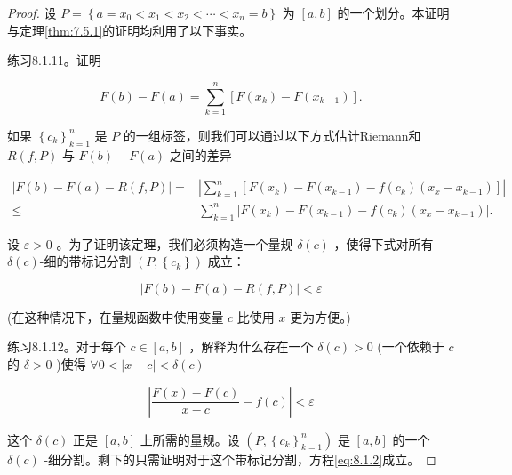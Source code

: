 \begin{proof}
设 \(P = \left\{  {a = {x}_{0} < {x}_{1} < {x}_{2} < \cdots  < {x}_{n} = b}\right\}\) 为 \(\left\lbrack  {a,b}\right\rbrack\) 的一个划分。本证明与定理\ref{thm:7.5.1}的证明均利用了以下事实。

练习8.1.11。证明

\[
F\left( b\right)  - F\left( a\right)  = \mathop{\sum }\limits_{{k = 1}}^{n}\left\lbrack  {F\left( {x}_{k}\right)  - F\left( {x}_{k - 1}\right) }\right\rbrack  .
\]

如果 \({\left\{  {c}_{k}\right\}  }_{k = 1}^{n}\) 是 \(P\) 的一组标签，则我们可以通过以下方式估计Riemann和 \(R\left( {f,P}\right)\) 与 \(F\left( b\right)  - F\left( a\right)\) 之间的差异

\begin{align*}
\left| {F\left( b\right)  - F\left( a\right)  - R\left( {f,P}\right) }\right|  = & \left| {\mathop{\sum }\limits_{{k = 1}}^{n}\left\lbrack  {F\left( {x}_{k}\right)  - F\left( {x}_{k - 1}\right)  - f\left( {c}_{k}\right) \left( {{x}_{x} - {x}_{k - 1}}\right) }\right\rbrack  }\right|\\
\leq & \mathop{\sum }\limits_{{k = 1}}^{n}\left| {F\left( {x}_{k}\right)  - F\left( {x}_{k - 1}\right)  - f\left( {c}_{k}\right) \left( {{x}_{x} - {x}_{k - 1}}\right) }\right| .
\end{align*}

设 \(\varepsilon  > 0\) 。为了证明该定理，我们必须构造一个量规 \(\delta \left( c\right)\) ，使得下式对所有 $\delta(c)$-细的带标记分割 $(P, \left\{ c_k \right\})$ 成立：

\begin{equation}
\label{eq:8.1.2}
\left| {F\left( b\right)  - F\left( a\right)  - R\left( {f,P}\right) }\right|  < \varepsilon
\end{equation}

(在这种情况下，在量规函数中使用变量 \(c\) 比使用 \(x\) 更为方便。)

练习8.1.12。对于每个 \(c \in  \left\lbrack  {a,b}\right\rbrack\) ，解释为什么存在一个 \(\delta \left( c\right)  > 0\) (一个依赖于 \(c\) 的 \(\delta  > 0\) )使得 $\forall 0 < \left| {x - c}\right|  < \delta \left( c\right)$

\[
\left| {\frac{F\left( x\right)  - F\left( c\right) }{x - c} - f\left( c\right) }\right|  < \varepsilon
\]

这个 \(\delta \left( c\right)\) 正是 \(\left\lbrack  {a,b}\right\rbrack\) 上所需的量规。设 \(\left( {P,{\left\{  {c}_{k}\right\}  }_{k = 1}^{n}}\right)\) 是 \(\left\lbrack  {a,b}\right\rbrack\) 的一个 \(\delta \left( c\right)\) -细分割。剩下的只需证明对于这个带标记分割，方程\eqref{eq:8.1.2}成立。


\end{proof}
